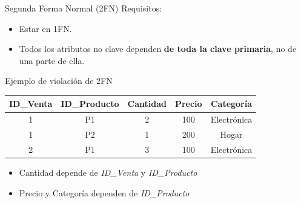 \documentclass{beamer}
\begin{document}
\begin{frame}{Segunda Forma Normal (2FN)}
    Requisitos:
    \begin{itemize}
        \item Estar en 1FN.
        \item Todos los atributos no clave dependen \textbf{de toda la clave primaria}, no de una parte de ella.
    \end{itemize}
\end{frame}

\begin{frame}{Ejemplo de violación de 2FN}
    \small
    \begin{center}
    \begin{tabular}{ccccc}
        \hline
        ID\_Venta & ID\_Producto & Cantidad & Precio & Categoría \\
        \hline
        1 & P1 & 2 & 100 & Electrónica \\
        1 & P2 & 1 & 200 & Hogar \\
        2 & P1 & 3 & 100 & Electrónica \\
        \hline
    \end{tabular}
    \end{center}

    \vspace{0.4cm}
    \begin{center}
    \begin{itemize}
        \item Cantidad depende de \textit{ID\_Venta} y \textit{ID\_Producto}
        \item Precio y Categoría dependen de \textit{ID\_Producto}
    \end{itemize}
    \end{center}
\end{frame}
\end{document}
